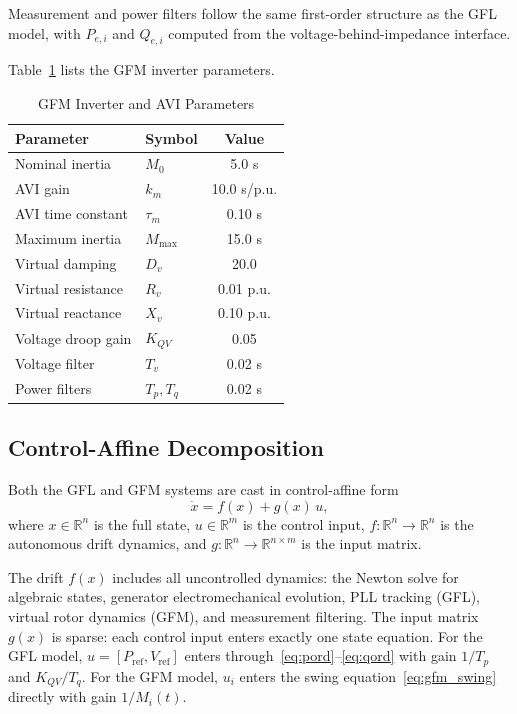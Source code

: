 \documentclass[11pt]{article}
\newcommand{\R}{\mathbb{R}}
\begin{document}
Measurement and power filters follow the same first-order structure
as the GFL model, with $P_{e,i}$ and $Q_{e,i}$ computed from the
voltage-behind-impedance interface.

Table~\ref{tab:gfm_params} lists the GFM inverter parameters.

\begin{table}[t]
\centering
\caption{GFM Inverter and AVI Parameters}
\label{tab:gfm_params}
\small
\begin{tabular}{@{}llc@{}}
\toprule
Parameter & Symbol & Value \\
\midrule
Nominal inertia     & $M_0$      & 5.0 s \\
AVI gain            & $k_m$      & 10.0 s/p.u. \\
AVI time constant   & $\tau_m$   & 0.10 s \\
Maximum inertia     & $M_{\max}$ & 15.0 s \\
Virtual damping     & $D_v$      & 20.0 \\
Virtual resistance  & $R_v$      & 0.01 p.u. \\
Virtual reactance   & $X_v$      & 0.10 p.u. \\
Voltage droop gain  & $K_{QV}$   & 0.05 \\
Voltage filter      & $T_v$      & 0.02 s \\
Power filters       & $T_p, T_q$ & 0.02 s \\
\bottomrule
\end{tabular}
\end{table}


\subsection{Control-Affine Decomposition}
\label{sec:control_affine}

Both the GFL and GFM systems are cast in control-affine form
\begin{equation}
  \dot{x} = f(x) + g(x)\,u,
  \label{eq:control_affine}
\end{equation}
where $x \in \R^n$ is the full state, $u \in \R^m$ is the control
input, $f : \R^n \to \R^n$ is the autonomous drift dynamics, and
$g : \R^n \to \R^{n \times m}$ is the input matrix.

The drift $f(x)$ includes all uncontrolled dynamics: the Newton solve
for algebraic states, generator electromechanical evolution, PLL
tracking (GFL), virtual rotor dynamics (GFM), and measurement
filtering.  The input matrix $g(x)$ is sparse: each control input
enters exactly one state equation.  For the GFL model,
$u = [P_{\mathrm{ref}}, V_{\mathrm{ref}}]$ enters
through~\eqref{eq:pord}--\eqref{eq:qord} with gain $1/T_p$ and
$K_{QV}/T_q$.  For the GFM model, $u_i$ enters the swing
equation~\eqref{eq:gfm_swing} directly with gain $1/M_i(t)$.
\end{document}
